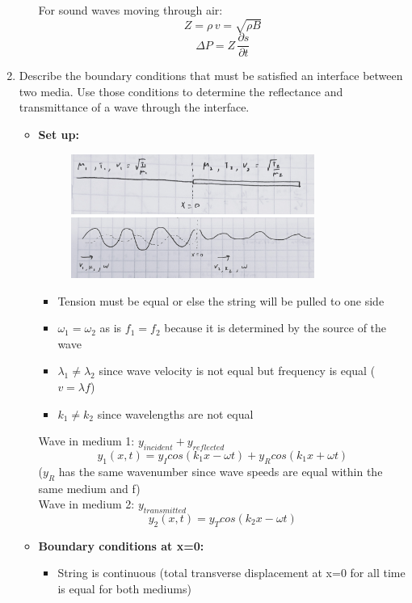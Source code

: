 \documentclass[12pt]{article}
\begin{document}
\begin{enumerate}
\begin{itemize}
For sound waves moving through air:
\[
Z = \rho \, v = \sqrt{\rho B}
\]
\[
\Delta P =  Z \, \frac{\partial s}{\partial t}
\]
\end{itemize}
    \item Describe the boundary conditions that must be satisfied an interface between two media. Use those conditions to determine the reflectance and transmittance of a wave through the interface.
\begin{itemize}
    \item \textbf{Set up:}
    \begin{figure}[H]
    \centering
    \includegraphics[width=0.8\textwidth]{Reflection 1.JPG}
    \includegraphics[width=0.8\textwidth]{Reflection 2.JPG}
    \end{figure}
    \begin{itemize}
        \item Tension must be equal or else the string will be pulled to one side
        \item $\omega_1=\omega_2$ as is $f_1=f_2$ because it is determined by the source of the wave
        \item $\lambda_1 \neq \lambda_2$ since wave velocity is not equal but frequency is equal ($v=\lambda f$)
        \item $k_1 \neq k_2$ since wavelengths are not equal
    \end{itemize}
    Wave in medium 1: $y_{incident}+y_{reflected}$
    \[y_1(x,t) = y_Icos(k_1x-\omega t)+y_Rcos(k_1x+\omega t)\]
    ($y_R$ has the same wavenumber since wave speeds are equal within the same medium and f)
    \\ Wave in medium 2: $y_{transmitted}$
    \[y_2(x,t)=y_Tcos(k_2x-\omega t)\]
    \item \textbf{Boundary conditions at x=0:}
    \begin{itemize}
    \item String is continuous (total transverse displacement at x=0 for all time is equal for both mediums)

\end{itemize}
\end{itemize}
\end{enumerate}
\end{document}
